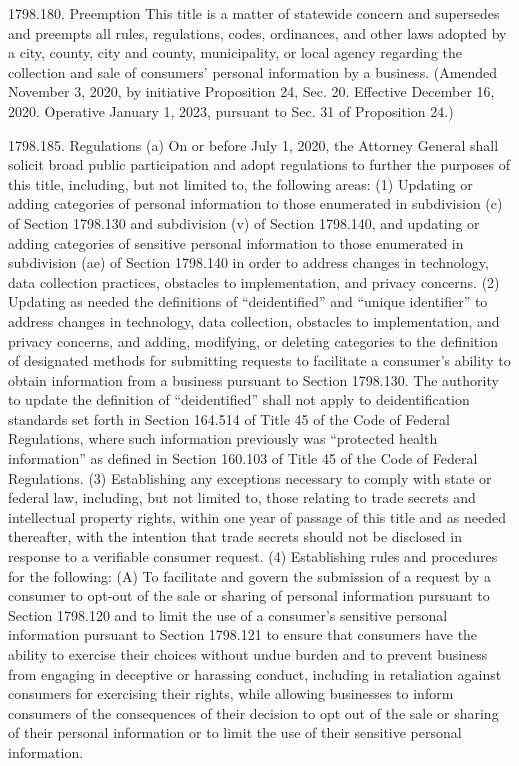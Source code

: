 1798.180.  Preemption
This title is a matter of statewide concern and supersedes and preempts all rules, regulations, codes, ordinances, and other laws adopted by a city, county, city and county, municipality, or local agency regarding the collection and sale of consumers’ personal information by a business.
(Amended November 3, 2020, by initiative Proposition 24, Sec. 20. Effective December 16, 2020. Operative January 1, 2023, pursuant to Sec. 31 of Proposition 24.)

1798.185.  Regulations
(a) On or before July 1, 2020, the Attorney General shall solicit broad public participation and adopt regulations to further the purposes of this title, including, but not limited to, the following areas:
(1) Updating or adding categories of personal information to those enumerated in subdivision (c) of Section 1798.130 and subdivision (v) of Section 1798.140, and updating or adding categories of sensitive personal information to those enumerated in subdivision (ae) of Section 1798.140 in order to address changes in technology, data collection practices, obstacles to implementation, and privacy concerns.
(2) Updating as needed the definitions of “deidentified” and “unique identifier” to address changes in technology, data collection, obstacles to implementation, and privacy concerns, and adding, modifying, or deleting categories to the definition of designated methods for submitting requests to facilitate a consumer’s ability to obtain information from a business pursuant to Section 1798.130. The authority to update the definition of “deidentified” shall not apply to deidentification standards set forth in Section 164.514 of Title 45 of the Code of Federal Regulations, where such information previously was “protected health information” as defined in Section 160.103 of Title 45 of the Code of Federal Regulations.
(3) Establishing any exceptions necessary to comply with state or federal law, including, but not limited to, those relating to trade secrets and intellectual property rights, within one year of passage of this title and as needed thereafter, with the intention that trade secrets should not be disclosed in response to a verifiable consumer request.
(4) Establishing rules and procedures for the following:
(A) To facilitate and govern the submission of a request by a consumer to opt-out of the sale or sharing of personal information pursuant to Section 1798.120 and to limit the use of a consumer’s sensitive personal information pursuant to Section 1798.121 to ensure that consumers have the ability to exercise their choices without undue burden and to prevent business from engaging in deceptive or harassing conduct, including in retaliation against consumers for exercising their rights, while allowing businesses to inform consumers of the consequences of their decision to opt out of the sale or sharing of their personal information or to limit the use of their sensitive personal information.
